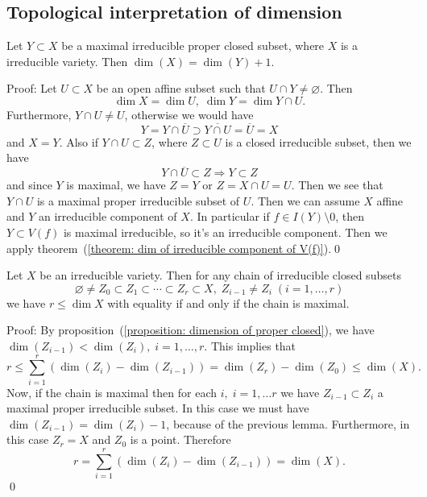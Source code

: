 \subsection{Topological interpretation of dimension}
\begin{dang}
\begin{lemma}
    Let $Y\subset X$ be a maximal irreducible proper closed subset, where $X$ is a irreducible variety. Then 
    $\dim(X)=\dim(Y)+1$.
\end{lemma}
\end{dang}
Proof: Let $U\subset X$ be an open affine subset such that $U\cap Y\neq\varnothing$. Then 
\begin{equation}
    \dim X=\dim U,\;\dim Y = \dim Y\cap U.
\end{equation}
Furthermore, $Y\cap U\neq U$, otherwise we would have
\begin{equation}
    Y=Y\cap \overline{U}\supset \overline{Y\cap U}=\overline{U}=X 
\end{equation} 
and $X=Y$. Also if $Y\cap U \subset Z$, where $Z\subset U$ is a closed irreducible subset, then we have 
\begin{equation}
    Y \cap \overline{U} \subset Z\Rightarrow Y\subset Z
\end{equation}
and since $Y$ is maximal, we have $Z=Y$ or $Z=X\cap U = U$. Then we see that $Y\cap U$ is a maximal proper 
irreducible subset of $U$. Then we can assume $X$ affine and $Y$ an irreducible component of $X$. In particular 
if $f\in I(Y)\setminus 0$, then $Y\subset V(f)$ is maximal irreducible, so it's an irreducible component. Then we apply 
theorem~(\ref{theorem: dim of irreducible component of V(f)}).\qed 

\begin{dang}
\begin{proposition}
    Let $X$ be an irreducible variety. Then for any chain of irreducible closed subsets  
    \begin{equation}
        \varnothing\neq Z_0\subset Z_1\subset\cdots\subset Z_r\subset X,\; Z_{i-1}\neq Z_i\;(i=1,\dots, r)
    \end{equation}
    we have $r\leq \dim X$ with equality if and only if the chain is maximal.
\end{proposition}
\end{dang}
Proof: By proposition~(\ref{proposition: dimension of proper closed}), we have 
$\dim(Z_{i-1})<\dim(Z_i),\;i=1,\dots,r$. This implies that 
\begin{equation}
    r \leq \sum_{i=1}^r (\dim(Z_i) - \dim(Z_{i-1})) = \dim(Z_r)-\dim(Z_0)\leq\dim(X).
\end{equation}
Now, if the chain is maximal then for each $i,\;i=1,\dots r$ we have $Z_{i-1}\subset Z_i$ a maximal proper 
irreducible subset. In this case we must have $\dim(Z_{i-1})=\dim(Z_i)-1$, because of the previous lemma. 
Furthermore, in this case $Z_r=X$ and $Z_0$ is a point. Therefore 
\begin{equation}
    r = \sum_{i=1}^r(\dim(Z_i) - \dim(Z_{i-1}))=\dim(X).
\end{equation}
\qed 


